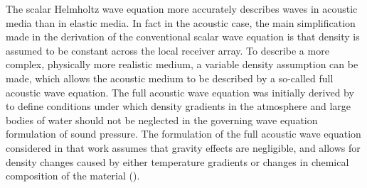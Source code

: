 \documentclass[]{article}
\begin{document}
	The scalar Helmholtz wave equation more accurately describes waves in acoustic media than in elastic media. In fact in the acoustic case, the main simplification made in the derivation of the conventional scalar wave equation is that density is assumed to be constant across the local receiver array. To describe a more complex, physically more realistic medium, a variable density assumption can be made, which allows the acoustic medium to be described by a so-called full acoustic wave equation. The full acoustic wave equation was initially derived by \textcite{bergmann1946wave} to define conditions under which density gradients in the atmosphere and large bodies of water should not be neglected in the governing wave equation formulation of sound pressure. The formulation of the full acoustic wave equation considered in that work assumes that gravity effects are negligible, and allows for density changes caused by either temperature gradients or changes in chemical composition of the material (\cite{bergmann1946wave}).\\ %
	
\end{document}

